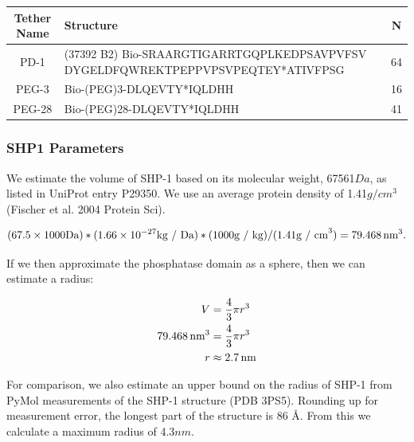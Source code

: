 \documentclass[../../AdvancementSummary.tex]{subfiles}
\begin{document}

\begin{center}
\begin{tabular}{| c | p{10cm} | c |}
	\hline
		Tether Name & Structure & N \\ 
		\hline 
		PD-1 	& 	(37392 B2) Bio-SRAARGTIGARRTGQPLKEDPSAVPVFSV
					DYGELDFQWREKTPEPPVPSVPEQTEY*ATIVFPSG 			& 	64	 \\
		PEG-3 	& 	Bio-(PEG)3-DLQEVTY*IQLDHH 							& 	16	 \\ 
		PEG-28 	& 	Bio-(PEG)28-DLQEVTY*IQLDHH 							& 	41	 \\
	\hline
\end{tabular}
\end{center}

\subsubsection{SHP1 Parameters}

We estimate the volume of SHP-1 based on its molecular weight, 67561$Da$,  as listed in UniProt entry P29350. We use an average protein density of 1.41$g/cm^3$ (Fischer et al. 2004 Protein Sci).


\begin{equation*}
(67.5 \times 1000 \mbox{Da}) * (1.66\times10^{-27} \mbox{kg / Da}) * (1000 \mbox{g / kg}) / (1.41 \mbox{g / cm}^3) = 79.468 \,\mbox{nm}^3.
\end{equation*}

If we then approximate the phosphatase domain as a sphere, then we can estimate a radius: 

\begin{align*}
V &= \frac{4}{3}\pi r^3 \\
79.468 \,\mbox{nm}^3 &= \frac{4}{3} \pi r^3 \\
r &\approx 2.7 \,\mbox{nm} \\
\end{align*}

For comparison, we also estimate an upper bound on the radius of SHP-1 from PyMol measurements of the SHP-1 structure (PDB 3PS5). Rounding up for measurement error, the longest part of the structure is 86 \AA. From this we calculate a maximum radius of 4.3$nm$.
\end{document}
